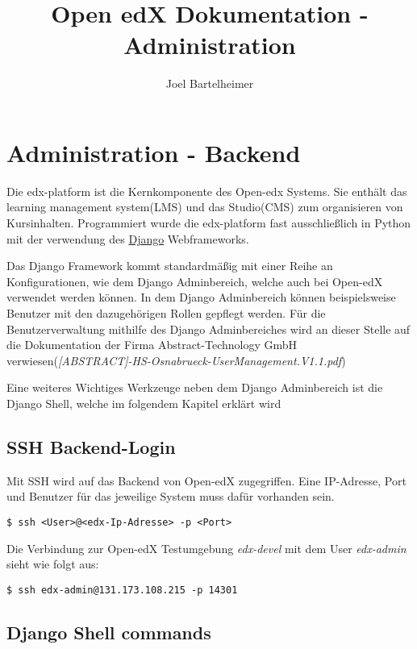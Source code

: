 \documentclass{scrartcl}
\title{Open edX Dokumentation - Administration}
\author{Joel Bartelheimer}
\begin{document}
\maketitle

\tableofcontents

\section{Administration - Backend}
\label{sec:admin}

Die edx-platform ist die Kernkomponente des Open-edx Systems. Sie enthält das learning management system(LMS) und das Studio(CMS) zum organisieren von Kursinhalten. Programmiert wurde die edx-platform fast ausschließlich in Python mit der verwendung des \href{https://www.djangoproject.com/}{Django} Webframeworks.

Das Django Framework kommt standardmäßig mit einer Reihe an Konfigurationen, wie dem Django Adminbereich, welche auch bei Open-edX verwendet werden können. In dem Django Adminbereich können beispielsweise Benutzer mit den dazugehörigen Rollen gepflegt werden. Für die Benutzerverwaltung mithilfe des Django Adminbereiches wird an dieser Stelle auf die Dokumentation der Firma Abstract-Technology GmbH verwiesen(\textit{[ABSTRACT]-HS-Osnabrueck-UserManagement.V1.1.pdf})

Eine weiteres Wichtiges Werkzeuge neben dem Django Adminbereich ist die Django Shell, welche im folgendem Kapitel erklärt wird

\subsection{SSH Backend-Login}
\label{sec:ssh}

Mit SSH wird auf das Backend von Open-edX zugegriffen. Eine IP-Adresse, Port und Benutzer für das jeweilige System muss dafür vorhanden sein.

\begin{lstlisting}
$ ssh <User>@<edx-Ip-Adresse> -p <Port>
\end{lstlisting}

Die Verbindung zur Open-edX Testumgebung \textit{edx-devel} mit dem User \textit{edx-admin} sieht wie folgt aus:

\begin{lstlisting}
$ ssh edx-admin@131.173.108.215 -p 14301
\end{lstlisting}



\subsection{Django Shell commands}
\end{document}
